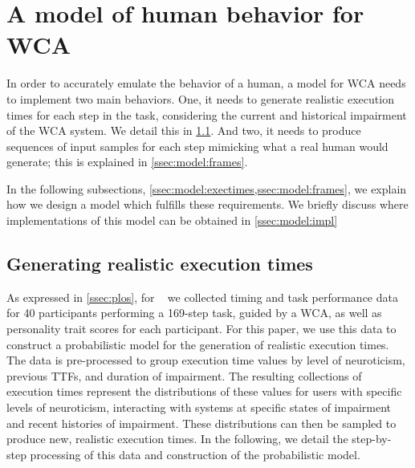 \section{A model of human behavior for \ac{WCA}}\label{sec:model}


In order to accurately emulate the behavior of a human, a model for \ac{WCA} needs to implement two main behaviors.
One, it needs to generate realistic execution times for each step in the task, considering the current and historical impairment of the \ac{WCA} system.
We detail this in \cref{ssec:model:exectimes}.
And two, it needs to produce sequences of input samples for each step mimicking what a real human would generate; this is explained in \cref{ssec:model:frames}.

In the following subsections, \cref{ssec:model:exectimes,ssec:model:frames}, we explain how we design a model which fulfills these requirements.
We briefly discuss where implementations of this model can be obtained in \cref{ssec:model:impl}

\subsection{Generating realistic execution times}\label{ssec:model:exectimes}

As expressed in \cref{ssec:plos}, for ~\cite{olguinmunoz:impact2021} we collected timing and task performance data for \num{40} participants performing a \num{169}-step task, guided by a \ac{WCA}, as well as personality trait scores for each participant.
For this paper, we use this data to construct a probabilistic model for the generation of realistic execution times.
The data is pre-processed to group execution time values by level of neuroticism, previous \acp{TTF}, and duration of impairment.
The resulting collections of execution times represent the distributions of these values for users with specific levels of neuroticism, interacting with systems at specific states of impairment and recent histories of impairment.
These distributions can then be sampled to produce new, realistic execution times.
In the following, we detail the step-by-step processing of this data and construction of the probabilistic model.

